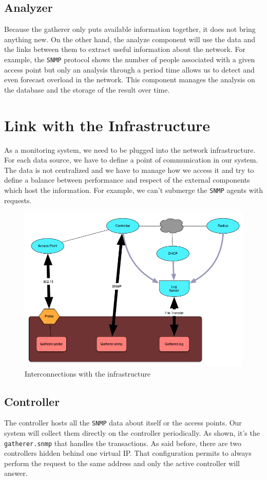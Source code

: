 \subsection{Analyzer}
Because the gatherer only puts available information together, it does not bring anything new. On the other hand, the analyze component will use the data and the links between them to extract useful information about the network. For example, the \texttt{SNMP} protocol shows the number of people associated with a given access point but only an analysis through a period time allows us to detect and even forecast overload in the network. This component manages the analysis on the database and the storage of the result over time.

\section{Link with the Infrastructure}
As a monitoring system, we need to be plugged into the network infrastructure. For each data source, we have to define a point of communication in our system. The data is not centralized and we have to manage how we access it and try to define a balance between performance and respect of the external components which host the information. For example, we can't submerge the \texttt{SNMP} agents with requests.

\begin{figure}[H]
\centering
	\includegraphics[width=1\linewidth]{Pictures/chapter3/interactions.jpg}
	\caption{Interconnections with the infrastructure}
\end{figure}

\subsection{Controller}
The controller hosts all the \texttt{SNMP} data about itself or the access points. Our system will collect them directly on the controller periodically. As shown, it's the \texttt{gatherer.snmp} that handles the transactions. As said before, there are two controllers hidden behind one virtual IP. That configuration permits to always perform the request to the same address and only the active controller will answer.

